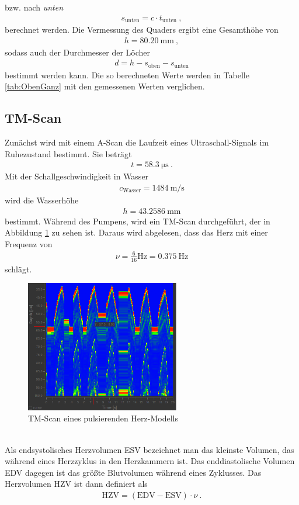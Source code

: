 bzw. nach \emph{unten}
\begin{align}
	s_\text{unten} = c \cdot t_\text{unten} \ ,
\end{align}
berechnet werden. Die Vermessung des Quaders ergibt eine Gesamthöhe von
\begin{align}
	h = \SI{80.20}{\milli\meter} \ ,
\end{align}
sodass auch der Durchmesser der Löcher
\begin{align}
	d = h - s_\text{oben} - s_\text{unten}
\end{align}
bestimmt werden kann. Die so berechneten Werte werden in Tabelle \ref{tab:ObenGanz} mit den gemessenen Werten verglichen.

\clearpage
\subsection{TM-Scan}
Zunächst wird mit einem A-Scan die Laufzeit eines Ultraschall-Signals im Ruhezustand bestimmt. Sie beträgt
\begin{align}
	t = \SI{58.3}{\micro\second} \ .
\end{align}
Mit der Schallgeschwindigkeit in Wasser
\begin{align}
	c_\text{Wasser} = \SI{1484}{\meter\per\second}
\end{align}
 wird die Wasserhöhe
\begin{align}
	h = \SI{43.2586}{\milli\meter}
\end{align}
bestimmt. Während des Pumpens, wird ein TM-Scan durchgeführt, der in Abbildung \ref{fig:Herz} zu sehen ist. Daraus wird abgelesen, dass das Herz mit einer Frequenz von
\begin{align}
	\nu = \frac{6}{16}\si{\hertz} = \SI{0.375}{\hertz}
\end{align}
\grqq schlägt\grqq.
\begin{figure}[h!]
	\centering
	\includegraphics[width=0.6\textwidth]{TimeScan.png}
	\caption{TM-Scan eines pulsierenden Herz-Modells}
	\label{fig:Herz}
\end{figure} \\
Als endsystolisches Herzvolumen ESV bezeichnet man das kleinste Volumen, das während eines Herzzyklus in den Herzkammern ist. Das enddiastolische Volumen EDV dagegen ist das größte Blutvolumen während eines Zyklusses. Das Herzvolumen HZV ist dann definiert als
\begin{align}
	\text{HZV} = (\text{EDV} - \text{ESV}) \cdot \nu \ .
\end{align}